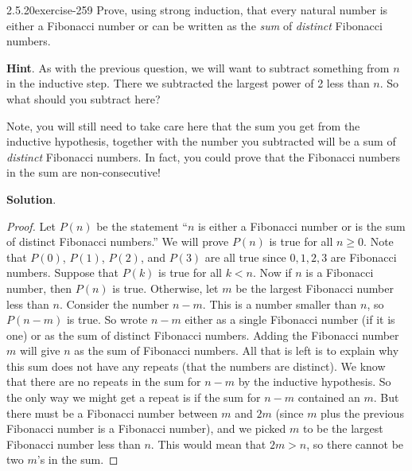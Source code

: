 \documentclass[twoside,11pt,]{book}
\numberwithin{equation}{chapter}
\newcommand{\lt}{<}
\begin{document}
\begin{divisionsolution}{2.5.20}{}{exercise-259}%
\hypertarget{p-3667}{}%
Prove, using strong induction, that every natural number is either a Fibonacci number or can be written as the \emph{sum} of \emph{distinct} Fibonacci numbers.%
\par\smallskip%
\noindent\textbf{Hint}.\quad%
\hypertarget{p-3668}{}%
As with the previous question, we will want to subtract something from \(n\) in the inductive step.  There we subtracted the largest power of 2 less than \(n\).  So what should you subtract here?%
\par
\hypertarget{p-3669}{}%
Note, you will still need to take care here that the sum you get from the inductive hypothesis, together with the number you subtracted will be a sum of \emph{distinct} Fibonacci numbers.  In fact, you could prove that the Fibonacci numbers in the sum are non-consecutive!%
\par\smallskip%
\noindent\textbf{Solution}.\quad%
\begin{proof}{}
\hypertarget{p-3670}{}%
Let \(P(n)\) be the statement ``\(n\) is either a Fibonacci number or is the sum of distinct Fibonacci numbers.'' We will prove \(P(n)\) is true for all \(n \ge 0\). Note that \(P(0)\), \(P(1)\), \(P(2)\), and \(P(3)\) are all true since \(0, 1, 2, 3\) are Fibonacci numbers. Suppose that \(P(k)\) is true for all \(k \lt n\). Now if \(n\) is a Fibonacci number, then \(P(n)\) is true. Otherwise, let \(m\) be the largest Fibonacci number less than \(n\). Consider the number \(n - m\). This is a number smaller than \(n\), so \(P(n-m)\) is true. So wrote \(n-m\) either as a single Fibonacci number (if it is one) or as the sum of distinct Fibonacci numbers. Adding the Fibonacci number \(m\) will give \(n\) as the sum of Fibonacci numbers. All that is left is to explain why this sum does not have any repeats (that the numbers are distinct). We know that there are no repeats in the sum for \(n-m\) by the inductive hypothesis. So the only way we might get a repeat is if the sum for \(n-m\) contained an \(m\). But there must be a Fibonacci number between \(m\) and \(2m\) (since \(m\) plus the previous Fibonacci number is a Fibonacci number), and we picked \(m\) to be the largest Fibonacci number less than \(n\). This would mean that \(2m > n\), so there cannot be two \(m\)'s in the sum.%
\end{proof}
\end{divisionsolution}%
\end{document}
